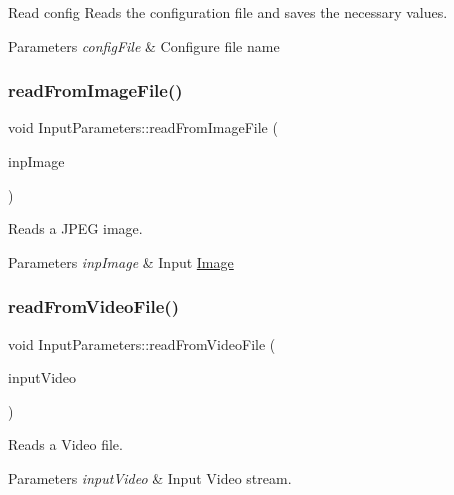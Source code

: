 Read config Reads the configuration file and saves the necessary values. 


\begin{DoxyParams}{Parameters}
{\em config\+File} & Configure file name \\
\hline
\end{DoxyParams}
\mbox{\label{classInputParameters_a3fbb650aef6f1e08d2bfea252d0386ee}} 
\subsubsection{\texorpdfstring{read\+From\+Image\+File()}{readFromImageFile()}}
{\footnotesize\ttfamily void Input\+Parameters\+::read\+From\+Image\+File (\begin{DoxyParamCaption}\item[{Mat \&}]{inp\+Image }\end{DoxyParamCaption})}



Reads a J\+P\+EG image. 


\begin{DoxyParams}{Parameters}
{\em inp\+Image} & Input \mbox{\hyperlink{classImage}{Image}} \\
\hline
\end{DoxyParams}
\mbox{\label{classInputParameters_af582f1a851f89f9c347f85d80787943f}} 
\subsubsection{\texorpdfstring{read\+From\+Video\+File()}{readFromVideoFile()}}
{\footnotesize\ttfamily void Input\+Parameters\+::read\+From\+Video\+File (\begin{DoxyParamCaption}\item[{Video\+Capture \&}]{input\+Video }\end{DoxyParamCaption})}



Reads a Video file. 


\begin{DoxyParams}{Parameters}
{\em input\+Video} & Input Video stream. \\
\hline
\end{DoxyParams}


